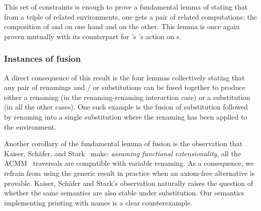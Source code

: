This set of constraints is enough to prove a fundamental lemma of 
stating that from a triple of related environments, one gets a pair of related
computations: the composition of  and  on one hand and
 on the other. This lemma is once again proven mutually with its
counterpart for \semrec{}'s 's action on s.

\begin{agdasnippet}
\end{agdasnippet}

\subsubsection{Instances of fusion}

A direct consequence of this result is the four lemmas collectively stating
that any pair of renamings and / or substitutions can be fused together to
produce either a renaming (in the renaming-renaming interaction case) or a
substitution (in all the other cases). One such example is the fusion of
substitution followed by renaming into a single substitution where the
renaming has been applied to the environment.

\begin{agdasnippet}
\end{agdasnippet}

Another corollary of the fundamental lemma of fusion is the observation that
Kaiser, Schäfer, and Stark~\citeyear{Kaiser-wsdebr} make: \emph{assuming
functional extensionality}, all the ACMM~\citeyear{allais2017type} traversals
are compatible with variable renaming.
As a consequence, we refrain from using the generic result in practice when
an axiom-free alternative is provable. Kaiser, Schäfer and Stark's observation
naturally raises the question of whether the same semantics are also stable
under substitution. Our semantics implementing printing with names is a clear
counterexample.


